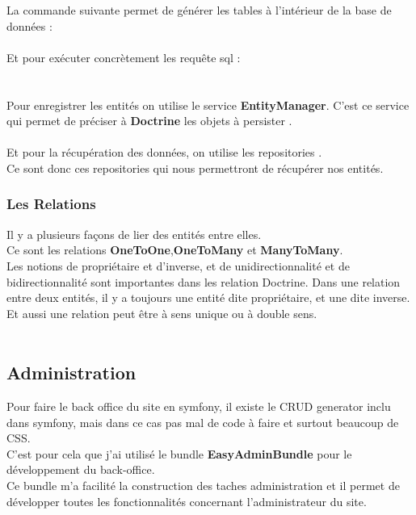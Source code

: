 \documentclass[12pt]{article}
\begin{document}
La commande suivante permet de générer les tables à l'intérieur de la base de données :\\
\\
Et pour exécuter concrètement les requête sql :\\
\\ \\

Pour enregistrer les entités on utilise le service \textbf{EntityManager}. 
 C'est ce service qui permet de préciser à  \textbf{Doctrine} les objets à persister .\\
 
\\

Et pour la récupération des données, on utilise les repositories .\\
Ce sont donc ces repositories qui nous permettront de récupérer nos entités. \\


\subsubsection{Les Relations}
Il y a plusieurs façons de lier des entités entre elles. \\
 Ce sont les relations \textbf{OneToOne},\textbf{OneToMany} et \textbf{ManyToMany}. \\
 Les notions de propriétaire et d'inverse, et de  unidirectionnalité et de bidirectionnalité sont  importantes dans les relation Doctrine. Dans une relation entre deux entités, il y a toujours une entité dite propriétaire, et une dite inverse.\\ 
 Et aussi  une relation peut être à sens unique ou à double sens.\\ \\





\subsection{Administration}



 Pour faire le back office du site en symfony, il existe  le CRUD generator inclu dans symfony, mais dans ce cas pas mal de code à faire et surtout beaucoup de CSS.\\
 C'est pour cela que j'ai utilisé le bundle \textbf{EasyAdminBundle} pour le développement du back-office.\\
 Ce bundle m'a facilité la construction des taches administration et il permet de développer toutes les 
 fonctionnalités concernant  l'administrateur du site.\\ \\
 
\end{document}
